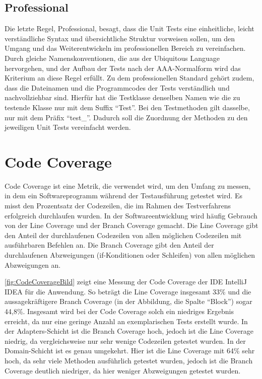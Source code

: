 \subsection{Professional}
Die letzte Regel, Professional, besagt, dass die Unit Tests eine einheitliche, leicht verständliche Syntax und übersichtliche Struktur vorweisen  sollen, um den Umgang und das Weiterentwickeln im professionellen Bereich zu vereinfachen. Durch gleiche Namenskonventionen, die aus der Ubiquitous Language hervorgehen, und der Aufbau der Tests nach der AAA-Normalform wird das Kriterium an diese Regel erfüllt. Zu dem professionellen Standard gehört zudem, dass die Dateinamen und die Programmcodes der Tests verständlich und nachvollziehbar sind. Hierfür hat die Testklasse denselben Namen wie die zu testende Klasse nur mit dem Suffix \enquote{Test}. Bei den Testmethoden gilt dasselbe, nur mit dem Präfix \enquote{test\_}. Dadurch soll die Zuordnung der Methoden zu den jeweiligen Unit Tests vereinfacht werden. 


\section{Code Coverage}
\label{CodeCoverage}

Code Coverage ist eine Metrik, die verwendet wird, um den Umfang zu messen, in dem ein Softwareprogramm während der Testausführung getestet wird. Es misst den Prozentsatz der Codezeilen, die im Rahmen des Testverfahrens erfolgreich durchlaufen wurden.
In der Softwareentwicklung wird häufig Gebrauch von der Line Coverage und der Branch Coverage gemacht. Die Line Coverage gibt den Anteil der durchlaufenen Codezeilen von allen möglichen Codezeilen mit ausführbaren Befehlen an. Die Branch Coverage gibt den Anteil der durchlaufenen Abzweigungen (if-Konditionen oder Schleifen) von allen möglichen Abzweigungen an.

\autoref{fig:CodeCoverageBild} zeigt eine Messung der Code Coverage der IDE IntelliJ IDEA für die Anwendung. So beträgt die Line Coverage insgesamt 33\% und die aussagekräftigere Branch Coverage (in der Abbildung, die Spalte \enquote{Block}) sogar 44,8\%. Insgesamt wird bei der Code Coverage solch ein niedriges Ergebnis erreicht, da nur eine geringe Anzahl an exemplarischen Tests erstellt wurde. 
In der Adapters-Schicht ist die Branch Coverage hoch, jedoch ist die Line Coverage niedrig, da vergleichsweise nur sehr wenige Codezeilen getestet wurden. In der Domain-Schicht ist es genau umgekehrt. Hier ist die Line Coverage mit 64\% sehr hoch, da sehr viele Methoden ausführlich getestet wurden, jedoch ist die Branch Coverage deutlich niedriger, da hier weniger Abzweigungen getestet wurden. 

